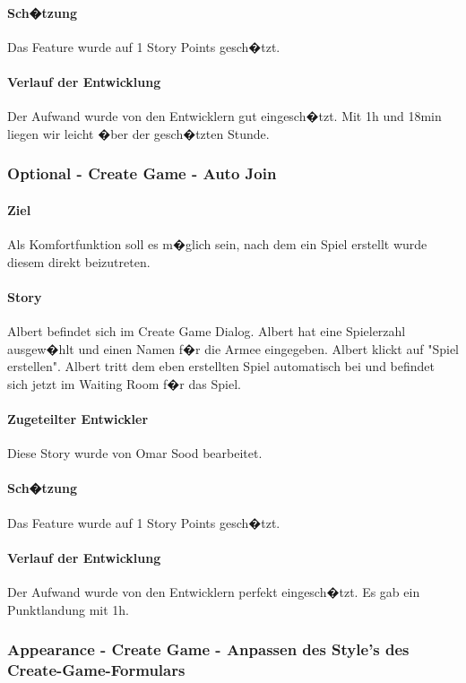 \documentclass[12pt, titlepage]{scrartcl}
\begin{document}
			\paragraph{Sch�tzung}
			Das Feature wurde auf 1 Story Points gesch�tzt.
			\paragraph{Verlauf der Entwicklung} 
			Der Aufwand wurde von den Entwicklern gut eingesch�tzt. Mit 1h und 18min liegen wir leicht �ber der gesch�tzten Stunde.
			
			\subsubsection{Optional - Create Game - Auto Join}
			\paragraph{Ziel} Als Komfortfunktion soll es m�glich sein, nach dem ein Spiel erstellt wurde diesem direkt beizutreten.
			\paragraph{Story} Albert befindet sich im Create Game Dialog. Albert hat eine Spielerzahl ausgew�hlt und einen Namen f�r die Armee eingegeben. Albert klickt auf "Spiel erstellen". Albert tritt dem eben erstellten Spiel automatisch bei und befindet sich jetzt im Waiting Room f�r das Spiel.
			\paragraph{Zugeteilter Entwickler} Diese Story wurde von Omar Sood bearbeitet.
			\paragraph{Sch�tzung}
			Das Feature wurde auf 1 Story Points gesch�tzt.
			\paragraph{Verlauf der Entwicklung} 
			Der Aufwand wurde von den Entwicklern perfekt eingesch�tzt. Es gab ein Punktlandung mit 1h. 
			
			\subsubsection{Appearance - Create Game - Anpassen des Style's des Create-Game-Formulars}
\end{document}
